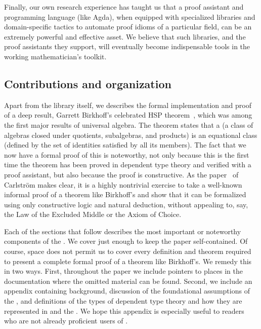 \documentclass[a4paper,UKenglish,cleveref,autoref,thm-restate]{lipics-v2021}
\begin{document}
Finally, our own research experience has taught us that a proof assistant and programming language (like Agda), when equipped with specialized libraries and domain-specific tactics to automate proof idioms of a particular field, can be an extremely powerful and effective asset. We believe that such libraries, and the proof assistants they support, will eventually become indispensable tools in the working mathematician's toolkit.



\subsection{Contributions and organization}
\label{sec:contributions}
Apart from the library itself, we describes the formal implementation and proof of a deep result, Garrett Birkhoff's celebrated HSP theorem~\cite{Birkhoff:1935}, which was among the first major results of universal algebra.  The theorem states that a  (a class of algebras closed under quotients, subalgebras, and products) is an equational class (defined by the set of identities satisfied by all its members).  %
The fact that we now have a formal proof of this is noteworthy, not only because this is the first time the theorem has been proved in dependent type theory and verified with a proof assistant, but also because the proof is constructive. As the paper~\cite{Carlstrom:2008} of Carlstr\"om makes clear, it is a highly nontrivial exercise to take a well-known informal proof of a theorem like Birkhoff's and show that it can be formalized using only constructive logic and natural deduction, without appealing to, say, the Law of the Excluded Middle or the Axiom of Choice.

Each of the sections that follow describes the most important or noteworthy components of the \ualib. We cover just enough to keep the paper self-contained.  Of course, space does not permit us to cover every definition and theorem required to present a complete formal proof of a theorem like Birkhoff's.  We remedy this in two ways. First, throughout the paper we include pointers to places in the documentation where the omitted material can be found.  Second, we include an appendix containing \agda background, discussion of the foundational assumptions of the \ualib, and definitions of the types of dependent type theory and how they are represented in \agda and the \ualib.  We hope this appendix is especially useful to readers who are not already proficient users of \agda.
\end{document}
